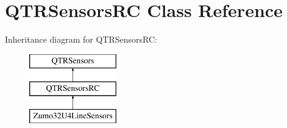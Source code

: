 \hypertarget{class_q_t_r_sensors_r_c}{}\section{Q\+T\+R\+Sensors\+RC Class Reference}
\label{class_q_t_r_sensors_r_c}
Inheritance diagram for Q\+T\+R\+Sensors\+RC\+:\begin{figure}[H]
\begin{center}
\leavevmode
\includegraphics[height=3.000000cm]{class_q_t_r_sensors_r_c}
\end{center}
\end{figure}
